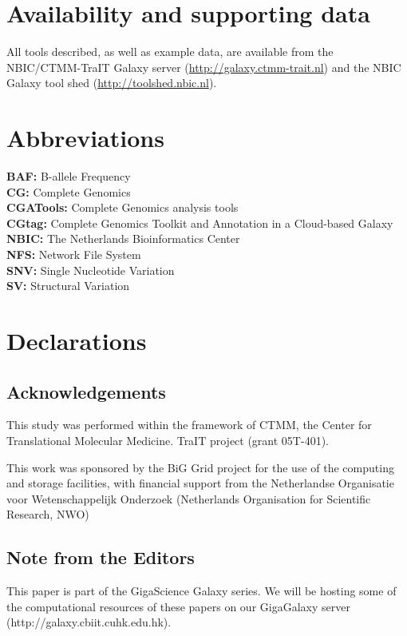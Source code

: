\section*{Availability and supporting data}

All tools described, as well as example data, are available from the NBIC/CTMM-TraIT Galaxy server (\url{http://galaxy.ctmm-trait.nl}) and the NBIC Galaxy tool shed (\url{http://toolshed.nbic.nl}).


\section*{Abbreviations}

\textbf{BAF:} B-allele Frequency \\
\textbf{CG:} Complete Genomics \\
\textbf{CGATools:} Complete Genomics analysis tools \\
\textbf{CGtag:} Complete Genomics Toolkit and Annotation in a Cloud-based Galaxy\\
\textbf{NBIC:} The Netherlands Bioinformatics Center\\
\textbf{NFS:} Network File System \\
\textbf{SNV:} Single Nucleotide Variation\\
\textbf{SV:} Structural Variation\\


\section*{Declarations}

\subsection*{Acknowledgements}

This study was performed within the framework of CTMM, the Center for Translational Molecular Medicine. TraIT project (grant 05T-401).

This work was sponsored by the BiG Grid project for the use of the computing and storage facilities, with financial support from the Netherlandse Organisatie voor Wetenschappelijk Onderzoek (Netherlands Organisation for Scientific Research, NWO)

\subsection*{Note from the Editors}
This paper is part of the GigaScience Galaxy series. We will be hosting some of the computational resources of these papers on our GigaGalaxy server (http://galaxy.cbiit.cuhk.edu.hk).

